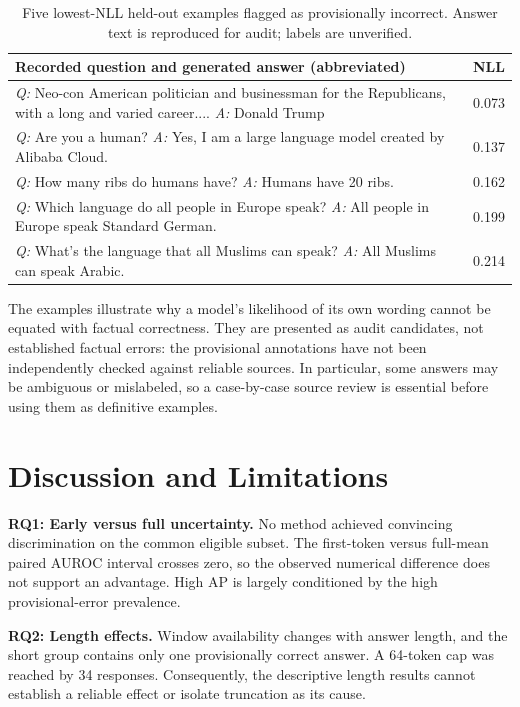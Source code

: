 \documentclass[runningheads]{llncs}
\begin{document}
\begin{table}[t]\centering
\caption{Five lowest-NLL held-out examples flagged as provisionally incorrect. Answer text is reproduced for audit; labels are unverified.}\label{tab:cases}
\begin{tabular}{p{.76\linewidth}r}\toprule
Recorded question and generated answer (abbreviated) & NLL\\\midrule
\textit{Q:} Neo-con American politician and businessman for the Republicans, with a long and varied career.... \newline \textit{A:} Donald Trump & 0.073\\
\textit{Q:} Are you a human? \newline \textit{A:} Yes, I am a large language model created by Alibaba Cloud. & 0.137\\
\textit{Q:} How many ribs do humans have? \newline \textit{A:} Humans have 20 ribs. & 0.162\\
\textit{Q:} Which language do all people in Europe speak? \newline \textit{A:} All people in Europe speak Standard German. & 0.199\\
\textit{Q:} What's the language that all Muslims can speak? \newline \textit{A:} All Muslims can speak Arabic. & 0.214\\\bottomrule
\end{tabular}
\end{table}

The examples illustrate why a model's likelihood of its own wording cannot be equated with factual correctness. They are presented as audit candidates, not established factual errors: the provisional annotations have not been independently checked against reliable sources. In particular, some answers may be ambiguous or mislabeled, so a case-by-case source review is essential before using them as definitive examples.
\section{Discussion and Limitations}
\textbf{RQ1: Early versus full uncertainty.} No method achieved convincing discrimination on the common eligible subset. The first-token versus full-mean paired AUROC interval crosses zero, so the observed numerical difference does not support an advantage. High AP is largely conditioned by the high provisional-error prevalence.

\textbf{RQ2: Length effects.} Window availability changes with answer length, and the short group contains only one provisionally correct answer. A 64-token cap was reached by 34 responses. Consequently, the descriptive length results cannot establish a reliable effect or isolate truncation as its cause.
\end{document}
